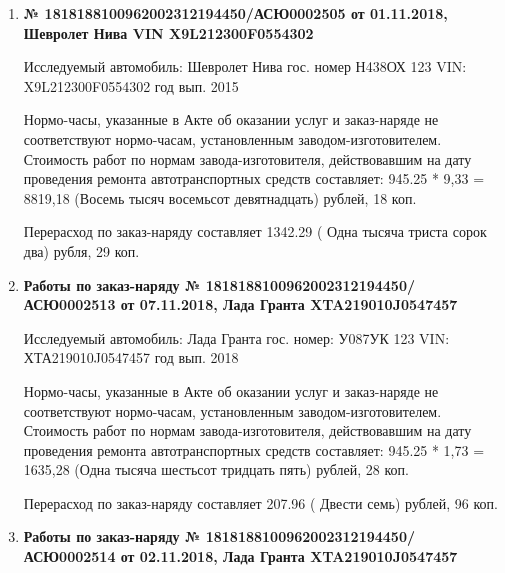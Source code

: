 \begin{enumerate}
\item \par\textbf{{№ 1818188100962002312194450/\-АСЮ0002505 от 01.11.2018, Шевролет Нива  VIN X9L212300F0554302}}


Исследуемый автомобиль:  Шевролет Нива гос. номер Н438ОХ 123 VIN: X9L212300F0554302 год вып. 2015



Нормо-часы, указанные в Акте об оказании услуг и заказ-наряде не соответствуют нормо-часам,  установленным заводом-изготовителем.\\
Стоимость работ по нормам завода-изготовителя, действовавшим на дату проведения ремонта автотранспортных средств составляет: 945.25 * 9,33 = 8819,18 (Восемь тысяч восемьсот девятнадцать) рублей, 18 коп.

Перерасход по заказ-наряду составляет 1342.29 ( Одна тысяча триста сорок два) рубля, 29 коп.  
\vspace{3mm}

\z{}{}




\item \par\textbf{{Работы по заказ-наряду № 1818188100962002312194450/\-АСЮ0002513 от 07.11.2018, Лада Гранта XTA219010J0547457
}}


Исследуемый автомобиль:  Лада Гранта гос. номер: У087УК 123 VIN: ХТА219010J0547457 год вып. 2018



Нормо-часы, указанные в Акте об оказании услуг и заказ-наряде не соответствуют нормо-часам,  установленным заводом-изготовителем.\\
Стоимость работ по нормам завода-изготовителя, действовавшим на дату проведения ремонта автотранспортных средств составляет: 945.25 * 1,73 = 1635,28 (Одна тысяча шестьсот тридцать пять) рублей, 28 коп.

Перерасход по заказ-наряду составляет 207.96 ( Двести семь) рублей, 96 коп.  
\vspace{3mm}





\item \par\textbf{{Работы по заказ-наряду № 1818188100962002312194450/\-АСЮ0002514 от 02.11.2018, Лада Гранта XTA219010J0547457
}}



\end{enumerate}
